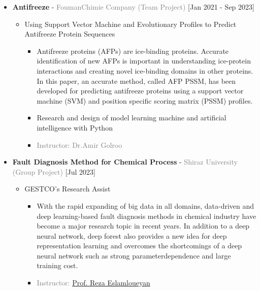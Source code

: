 \documentclass[10pt,a4paper,sans]{moderncv} %
\begin{document}
	\vspace{2em}
	
	\begin{itemize}
		\item {}  \textbf{Antifreeze}  - \textcolor{gray}{FoumanChimie Company}  \hfill\textcolor{gray}{(Team Project)}   [Jan 2021 - Sep 2023]
		\begin{itemize}
			\item Using Support Vector Machine and Evolutionary Profiles to Predict Antifreeze Protein Sequences 
			\begin{itemize} 
		     	\item Antifreeze proteins (AFPs) are ice-binding proteins. Accurate identification of new AFPs is important in understanding ice-protein interactions and creating novel ice-binding domains in other proteins. In this paper, an accurate method, called AFP PSSM, has been developed for predicting antifreeze proteins using a support vector machine (SVM) and position specific scoring matrix (PSSM) profiles.
		     	\item Research and design of model learning machine and artificial intelligence with Python
				
				
			    
				\item\textcolor{gray}{Instructor: Dr.Amir Golroo}
			\end{itemize}
			

			
		\end{itemize}
	\end{itemize}
	
	\vspace{2em}
	
	\begin{itemize}
		\item {}  \textbf{Fault Diagnosis Method for Chemical Process} - \textcolor{gray}{Shiraz University}    \hfill\textcolor{gray}{(Group Project)}   [Jul 2023]
		\begin{itemize}
			\item GESTCO's Research Assist 
			\begin{itemize} 
		     	\item With the rapid expanding of big data in all domains, data-driven and deep learning-based fault diagnosis methods in chemical industry have become a major research topic in recent years. In addition to a deep neural network, deep forest also provides a new idea for deep representation learning and overcomes the shortcomings of a deep neural network such as strong parameterdependence and large training cost. 
				
			\item \textcolor{gray}{Instructor: \href{https://profile.shirazu.ac.ir/en/~eslamlouian}{Prof. Reza Eslamloueyan}}

			\end{itemize}
		\end{itemize}
	\end{itemize}
\end{document}

